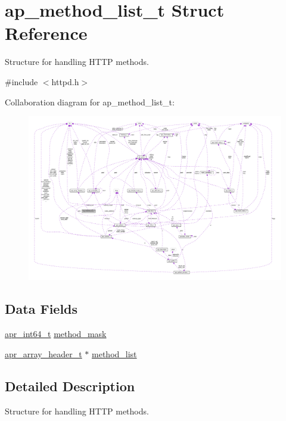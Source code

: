 \hypertarget{structap__method__list__t}{}\section{ap\+\_\+method\+\_\+list\+\_\+t Struct Reference}
\label{structap__method__list__t}


Structure for handling H\+T\+TP methods.  




{\ttfamily \#include $<$httpd.\+h$>$}



Collaboration diagram for ap\+\_\+method\+\_\+list\+\_\+t\+:
\nopagebreak
\begin{figure}[H]
\begin{center}
\leavevmode
\includegraphics[width=350pt]{structap__method__list__t__coll__graph}
\end{center}
\end{figure}
\subsection*{Data Fields}
\begin{DoxyCompactItemize}
\item 
\hyperlink{group__apr__platform_ga4b75afbf973dc6c8aea4ae75b044aa08}{apr\+\_\+int64\+\_\+t} \hyperlink{structap__method__list__t_ab6731b9ec374b50374eafbbb4fdb31f5}{method\+\_\+mask}
\item 
\hyperlink{structapr__array__header__t}{apr\+\_\+array\+\_\+header\+\_\+t} $\ast$ \hyperlink{structap__method__list__t_a1062e3a59fa2aa181f3d87a05bde21c9}{method\+\_\+list}
\end{DoxyCompactItemize}


\subsection{Detailed Description}
Structure for handling H\+T\+TP methods. 

